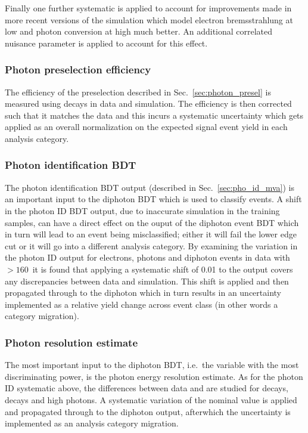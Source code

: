 Finally one further systematic is applied to account for improvements made in more recent versions of the simulation which model electron bremsstrahlung at low \pT and photon conversion at high \pT much better. An additional correlated nuisance parameter is applied to account for this effect.

\subsubsection{Photon preselection efficiency}

The efficiency of the preselection described in Sec.~\ref{sec:photon_presel} is measured using \Zee decays in data and \MC simulation. The \MC efficiency is then corrected such that it matches the data and this incurs a systematic uncertainty which gets applied as an overall normalization on the expected signal event yield in each analysis category. 

\subsubsection{Photon identification BDT}

The photon identification BDT output (described in Sec.~\ref{sec:pho_id_mva}) is an important input to the diphoton BDT which is used to classify events. A shift in the photon ID BDT output, due to inaccurate simulation in the training samples, can have a direct effect on the ouput of the diphoton event BDT which in turn will lead to an event being misclassified; either it will fail the lower edge cut or it will go into a different analysis category. By examining the variation in the photon ID output for \Zee electrons, \Zmumugamma photons and diphoton events in data with \mgg$>160$~\GeV it is found that applying a systematic shift of 0.01 to the output covers any discrepancies between data and \MC simulation. This shift is applied and then propagated through to the diphoton \BDT which in turn results in an uncertainty implemented as a relative yield change across event class (in other words a category migration).

\subsubsection{Photon resolution estimate}

The most important input to the diphoton BDT, i.e.\ the variable with the most discriminating power, is the photon energy resolution estimate. As for the photon ID systematic above, the differences between data and \MC are studied for \Zee decays, \Zmumugamma decays and high \pT photons. A systematic variation of the nominal value is applied and propagated through to the diphoton \BDT output, afterwhich the uncertainty is implemented as an analysis category migration.

